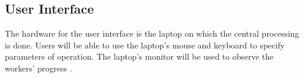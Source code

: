 
\subsection{User Interface}
\label{sec:hardware_ui}

The hardware for the user interface is the laptop on which the central processing is done. Users will be able to use the laptop's mouse and keyboard to specify parameters of operation. The laptop's monitor will be used to observe the workers' progress .